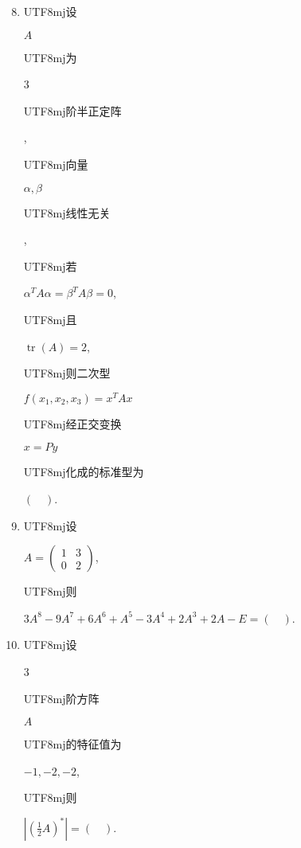 \documentclass[10pt]{article}
\begin{document}
\begin{enumerate}
  \setcounter{enumi}{7}
  \item \begin{CJK}{UTF8}{mj}设\end{CJK} $A$ \begin{CJK}{UTF8}{mj}为\end{CJK} 3 \begin{CJK}{UTF8}{mj}阶半正定阵\end{CJK}, \begin{CJK}{UTF8}{mj}向量\end{CJK} $\alpha, \beta$ \begin{CJK}{UTF8}{mj}线性无关\end{CJK}, \begin{CJK}{UTF8}{mj}若\end{CJK} $\alpha^{T} A \alpha=\beta^{T} A \beta=0$, \begin{CJK}{UTF8}{mj}且\end{CJK} $\operatorname{tr}(A)=2$, \begin{CJK}{UTF8}{mj}则二次型\end{CJK} $f\left(x_{1}, x_{2}, x_{3}\right)=x^{T} A x$ \begin{CJK}{UTF8}{mj}经正交变换\end{CJK} $x=P y$ \begin{CJK}{UTF8}{mj}化成的标准型为\end{CJK} $(\quad)$.

  \item \begin{CJK}{UTF8}{mj}设\end{CJK} $A=\left(\begin{array}{ll}1 & 3 \\ 0 & 2\end{array}\right)$, \begin{CJK}{UTF8}{mj}则\end{CJK} $3 A^{8}-9 A^{7}+6 A^{6}+A^{5}-3 A^{4}+2 A^{3}+2 A-E=(\quad)$.

  \item \begin{CJK}{UTF8}{mj}设\end{CJK} 3 \begin{CJK}{UTF8}{mj}阶方阵\end{CJK} $A$ \begin{CJK}{UTF8}{mj}的特征值为\end{CJK} $-1,-2,-2$, \begin{CJK}{UTF8}{mj}则\end{CJK} $\left|\left(\frac{1}{2} A\right)^{*}\right|=(\quad)$.

\end{enumerate}
\end{document}
